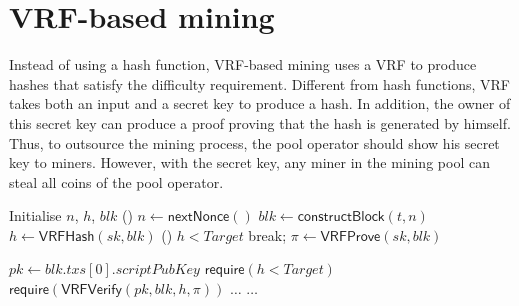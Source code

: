 \section{VRF-based mining}

Instead of using a hash function, VRF-based mining uses a VRF to produce hashes that satisfy the difficulty requirement.
Different from hash functions, VRF takes both an input and a secret key to produce a hash.
In addition, the owner of this secret key can produce a proof proving that the hash is generated by himself.
Thus, to outsource the mining process, the pool operator should show his secret key to miners.
However, with the secret key, any miner in the mining pool can steal all coins of the pool operator.


\begin{algorithm}[H]
\caption{$\mathsf{Work}(sk, t, Target)$.}
\label{algo:work}
\SetAlgoLined
{}
  Initialise $n$, $h$, $blk$ 
  \While () {$n \gets \mathsf{nextNonce}()$}{
    $blk \gets \mathsf{constructBlock}(t, n)$ 
    $h \gets \mathsf{VRFHash}(sk, blk)$ 
    \If () {$h < Target$}{
      break; 
    }
  }
  $\pi \gets \mathsf{VRFProve}(sk, blk)$ 
   
\end{algorithm}





\begin{algorithm}[H]
\caption{$\mathsf{Verify}(blk, h, \pi)$}
\label{algo:verify}
\SetAlgoLined
$pk \gets blk . txs[0] . scriptPubKey$ 
$\mathsf{require}(h < Target)$ 
$\mathsf{require}(\mathsf{VRFVerify}(pk, blk, h, \pi))$ \;
$\dots$ 
$\dots$ 
\end{algorithm}
